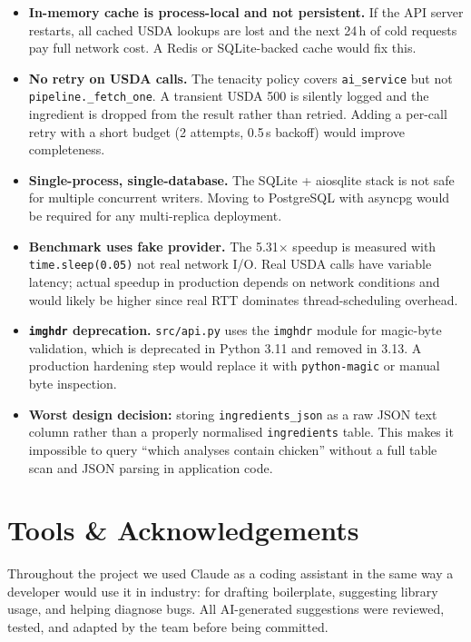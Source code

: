 \documentclass[11pt,a4paper]{article}
\begin{document}
\begin{itemize}
  \item \textbf{In-memory cache is process-local and not persistent.} If the API server restarts, all cached USDA lookups are lost and the next 24\,h of cold requests pay full network cost. A Redis or SQLite-backed cache would fix this.
  \item \textbf{No retry on USDA calls.} The tenacity policy covers \texttt{ai\_service} but not \texttt{pipeline.\_fetch\_one}. A transient USDA 500 is silently logged and the ingredient is dropped from the result rather than retried. Adding a per-call retry with a short budget (2 attempts, 0.5\,s backoff) would improve completeness.
  \item \textbf{Single-process, single-database.} The SQLite + aiosqlite stack is not safe for multiple concurrent writers. Moving to PostgreSQL with asyncpg would be required for any multi-replica deployment.
  \item \textbf{Benchmark uses fake provider.} The 5.31$\times$ speedup is measured with \texttt{time.sleep(0.05)} not real network I/O. Real USDA calls have variable latency; actual speedup in production depends on network conditions and would likely be higher since real RTT dominates thread-scheduling overhead.
  \item \textbf{\texttt{imghdr} deprecation.} \texttt{src/api.py} uses the \texttt{imghdr} module for magic-byte validation, which is deprecated in Python 3.11 and removed in 3.13. A production hardening step would replace it with \texttt{python-magic} or manual byte inspection.
  \item \textbf{Worst design decision:} storing \texttt{ingredients\_json} as a raw JSON text column rather than a properly normalised \texttt{ingredients} table. This makes it impossible to query ``which analyses contain chicken'' without a full table scan and JSON parsing in application code.
\end{itemize}

\section{Tools \& Acknowledgements}\label{sec:tools}

Throughout the project we used Claude as a coding assistant in the same way a developer would use it in industry: for drafting boilerplate, suggesting library usage, and helping diagnose bugs. All AI-generated suggestions were reviewed, tested, and adapted by the team before being committed.
\end{document}
